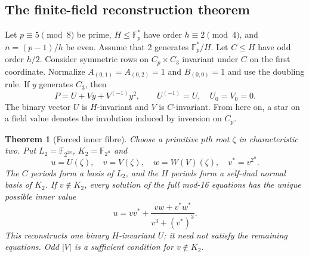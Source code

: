 \documentclass[11pt]{article}
\newtheorem{theorem}{Theorem}[section]
\theoremstyle{definition}
\theoremstyle{remark}
\begin{document}
\subsection{The finite-field reconstruction theorem}
Let $p\equiv5\pmod8$ be prime, $H\le\mathbb F_p^*$ have order
$h\equiv2\pmod4$, and $n=(p-1)/h$ be even. Assume that 2 generates
$\mathbb F_p^*/H$. Let $C\le H$ have odd order $h/2$. Consider symmetric
rows on $C_p\times C_3$ invariant under $C$ on the first coordinate.
Normalize $A_{(0,1)}=A_{(0,2)}=1$ and $B_{(0,0)}=1$ and use the
doubling rule. If $y$ generates $C_3$, then
\[
 P=U+Vy+V^{(-1)}y^2,\qquad U^{(-1)}=U,\quad U_0=V_0=0.
\]
The binary vector $U$ is $H$-invariant and $V$ is $C$-invariant. From
here on, a star on a field value denotes the involution induced by
inversion on $C_p$.

\begin{theorem}[Forced inner fibre]\label{thm:forced}
Choose a primitive $p$th root $\zeta$ in characteristic two. Put
$L_2=\mathbb F_{2^{2n}}$, $K_2=\mathbb F_{2^n}$ and
\[
 u=U(\zeta),\quad v=V(\zeta),\quad w=W(V)(\zeta),\quad v^*=v^{2^n}.
\]
The $C$ periods form a basis of $L_2$, and the $H$ periods form a self-dual
normal basis of $K_2$. If $v\notin K_2$, every solution of the full mod-16
equations has the unique possible inner value
\begin{equation}\label{eq:forced}
 u=vv^*+\frac{vw+v^*w^*}{v^3+(v^*)^3}.
\end{equation}
This reconstructs one binary $H$-invariant $U$; it need not satisfy the
remaining equations. Odd $|V|$ is a sufficient condition for $v\notin K_2$.
\end{theorem}
\end{document}
